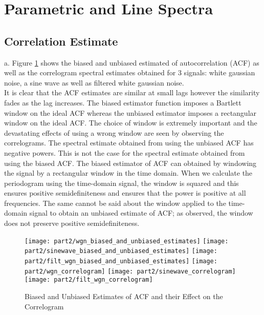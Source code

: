 \section{Parametric and Line Spectra}

\subsection{Correlation Estimate}

\noindent{}a. Figure \ref{fig:correlogram} shows the biased and unbiased estimated of autocorrelation (ACF) as well as the correlogram spectral estimates obtained for 3 signals: white gaussian noise, a sine wave as well as filtered white gaussian noise.\\

\noindent{}It is clear that the ACF estimates are similar at small lags however the similarity fades as the lag increases. The biased estimator function imposes a Bartlett window on the ideal ACF whereas the unbiased estimator imposes a rectangular window on the ideal ACF. The choice of window is extremely important and the devastating effects of using a wrong window are seen by observing the correlograms. The spectral estimate obtained from using the unbiased ACF has negative powers. This is not the case for the spectral estimate obtained from using the biased ACF. The biased estimator of ACF can obtained by windowing the signal by a rectangular window in the time domain. When we calculate the periodogram using the time-domain signal, the window is squared and this ensures positive semidefiniteness and ensures that the power is positive at all frequencies. The same cannot be said about the window applied to the time-domain signal to obtain an unbiased estimate of ACF; as observed, the window does not preserve positive semidefiniteness.

\begin{figure}[H]
\centering{}
\texttt{[image: part2/wgn\_biased\_and\_unbiased\_estimates]}
\texttt{[image: part2/sinewave\_biased\_and\_unbiased\_estimates]}
\texttt{[image: part2/filt\_wgn\_biased\_and\_unbiased\_estimates]}
\texttt{[image: part2/wgn\_correlogram]}
\texttt{[image: part2/sinewave\_correlogram]}
\texttt{[image: part2/filt\_wgn\_correlogram]}
\caption{Biased and Unbiased Estimates of ACF and their Effect on the Correlogram}
\label{fig:correlogram}
\end{figure}

